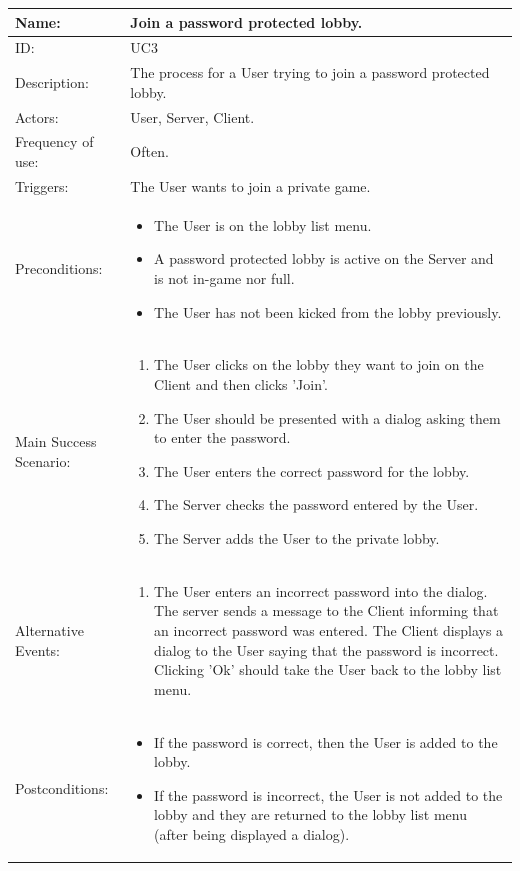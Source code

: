\documentclass[12pt]{article}
\newcommand{\nl}{\newline\vspace*{1 cm}\newline}
\begin{document}
\nl
\begin{tabularx}{\textwidth}{|l|X|} \hline
Name: & \textbf{Join a password protected lobby.} \\ \hline
ID: & UC3 \\ \hline
Description: & The process for a User trying to join a password protected lobby. \\ \hline
Actors: & User, Server, Client. \\ \hline
Frequency of use: & Often. \\ \hline
Triggers: & The User wants to join a private game. \\ \hline
Preconditions: & \begin{itemize}
\item The User is on the lobby list menu.
\item A password protected lobby is active on the Server and is not in-game nor full.
\item The User has not been kicked from the lobby previously.
\end{itemize} \\ \hline
Main Success Scenario: & \begin{enumerate}
\item The User clicks on the lobby they want to join on the Client and then clicks 'Join'.
\item The User should be presented with a dialog asking them to enter the password.
\item The User enters the correct password for the lobby.
\item The Server checks the password entered by the User.
\item The Server adds the User to the private lobby.
\end{enumerate} \\ \hline
Alternative Events: & \begin{enumerate}
\item The User enters an incorrect password into the dialog. The server sends a message to the Client informing that an incorrect password was entered. The Client displays a dialog to the User saying that the password is incorrect. Clicking 'Ok' should take the User back to the lobby list menu.
\end{enumerate} \\ \hline
Postconditions: & \begin{itemize}
\item If the password is correct, then the User is added to the lobby.
\item If the password is incorrect, the User is not added to the lobby and they are returned to the lobby list menu (after being displayed a dialog).
\end{itemize} \\ \hline
\end{tabularx}
\end{document}

